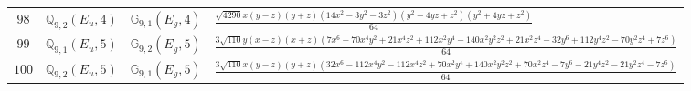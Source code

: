\documentclass[fleqn,8pt,landscape]{jsarticle}
\begin{document}
\begin{table}[ht!]
\begin{center}
\begin{tabular}{cccl}
$ 98 $ & $ \mathbb{Q}_{9,2}(E_{u},4) $ & $ \mathbb{G}_{9,1}(E_{g},4) $ & $ \frac{\sqrt{4290} x \left(y - z\right) \left(y + z\right) \left(14 x^{2} - 3 y^{2} - 3 z^{2}\right) \left(y^{2} - 4 y z + z^{2}\right) \left(y^{2} + 4 y z + z^{2}\right)}{64} $ \\
$ 99 $ & $ \mathbb{Q}_{9,1}(E_{u},5) $ & $ \mathbb{G}_{9,2}(E_{g},5) $ & $ \frac{3 \sqrt{110} y \left(x - z\right) \left(x + z\right) \left(7 x^{6} - 70 x^{4} y^{2} + 21 x^{4} z^{2} + 112 x^{2} y^{4} - 140 x^{2} y^{2} z^{2} + 21 x^{2} z^{4} - 32 y^{6} + 112 y^{4} z^{2} - 70 y^{2} z^{4} + 7 z^{6}\right)}{64} $ \\
$ 100 $ & $ \mathbb{Q}_{9,2}(E_{u},5) $ & $ \mathbb{G}_{9,1}(E_{g},5) $ & $ \frac{3 \sqrt{110} x \left(y - z\right) \left(y + z\right) \left(32 x^{6} - 112 x^{4} y^{2} - 112 x^{4} z^{2} + 70 x^{2} y^{4} + 140 x^{2} y^{2} z^{2} + 70 x^{2} z^{4} - 7 y^{6} - 21 y^{4} z^{2} - 21 y^{2} z^{4} - 7 z^{6}\right)}{64} $ \\
 \hline \hline
\end{tabular}
\end{center}
\end{table}
\end{document}
